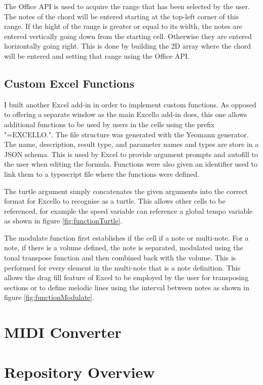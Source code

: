 The Office API is used to acquire the range that has been selected by the user. The notes of the chord will be entered starting at the top-left corner of this range. If the hight of the range is greater or equal to its width, the notes are entered vertically going down from the starting cell. Otherwise they are entered horizontally going right. This is done by building the 2D array where the chord will be entered and setting that range using the Office API.

\subsection{Custom Excel Functions}

I built another Excel add-in in order to implement custom functions. As opposed to offering a separate window as the main Excello add-in does, this one allows additional functions to be used by users in the cells using the prefix "=EXCELLO.". The file structure was generated with the Yeomann generator. The name, description, result type, and parameter names and types are store in a JSON schema. This is used by Excel to provide argument prompts and autofill to the user when editing the formula. Functions were also given an identifier used to link them to a typescript file where the functions were defined.

The turtle argument simply concatenates the given arguments into the correct format for Excello to recognise as a turtle. This allows other cells to be referenced, for example the speed variable can reference a global tempo variable as shown in figure \ref{fig:functionTurtle}.

The modulate function first establishes if the cell if a note or multi-note. For a note, if there is a volume defined, the note is separated, modulated using the tonal transpose function and then combined back with the volume. This is performed for every element in the multi-note that is a note definition. This allows the drag fill feature of Excel to be employed by the user for transposing sections or to define melodic lines using the interval between notes as shown in figure \ref{fig:functionModulate}.

\section{MIDI Converter}

\section{Repository Overview}

